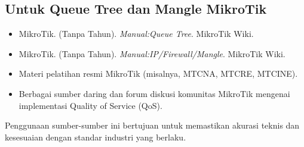 \subsection*{Untuk Queue Tree dan Mangle MikroTik}
\begin{itemize}
    \item MikroTik. (Tanpa Tahun). \textit{Manual:Queue Tree}. MikroTik Wiki.
    \item MikroTik. (Tanpa Tahun). \textit{Manual:IP/Firewall/Mangle}. MikroTik Wiki.
    \item Materi pelatihan resmi MikroTik (misalnya, MTCNA, MTCRE, MTCINE).
    \item Berbagai sumber daring dan forum diskusi komunitas MikroTik mengenai implementasi Quality of Service (QoS).
\end{itemize}
Penggunaan sumber-sumber ini bertujuan untuk memastikan akurasi teknis dan kesesuaian dengan standar industri yang berlaku.